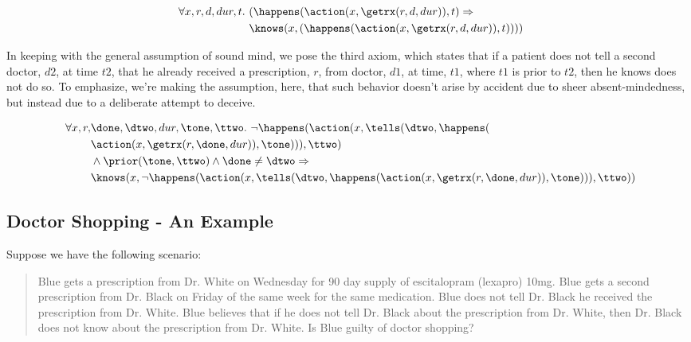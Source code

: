 \begin{footnotesize}
\begin{align*}
[A2] \ \forall x, r, d, dur, t . \ &(\happens(\action(x, \getrx(r, d, dur)), t) \Rightarrow \\
& \knows(x,(\happens(\action(x,\getrx(r,d,dur)), t))))
\end{align*}
\end{footnotesize}

In keeping with the general assumption of sound mind, we pose the third axiom, which states that if a patient does not tell a second doctor, $d2$, at time $t2$, that he already received a prescription, $r$, from doctor, $d1$, at time, $t1$, where $t1$ is prior to $t2$, then he knows does not do so.  To emphasize, we're making the assumption, here, that such behavior doesn't arise by accident due to sheer absent-mindedness, but instead due to a deliberate attempt to deceive.


\begin{footnotesize}
\begin{align*}
[A3] \ \forall x, r, &\done, \dtwo, dur, \tone, \ttwo . \ \neg \happens(\action(x,\tells(\dtwo,\happens( \\
& \action(x,\getrx(r,\done,dur)),\tone))),\ttwo) \\
& \wedge \prior(\tone,\ttwo) \wedge \done \neq \dtwo \Rightarrow \\
& \knows(x, \neg \happens(\action(x,\tells(\dtwo,\happens(\action(x,\getrx(r,\done,dur)),\tone))),\ttwo))
\end{align*}
\end{footnotesize}


\subsection{Doctor Shopping - An Example}

Suppose we have the following scenario:
\blockquote{Blue gets a prescription from Dr. White on Wednesday for 90 day supply of escitalopram (lexapro) 10mg.  Blue gets a second prescription from Dr. Black on Friday of the same week for the same medication.  Blue does not tell Dr. Black he received the prescription from Dr. White.  Blue believes that if he does not tell Dr. Black about the prescription from Dr. White, then Dr. Black does not know about the prescription from Dr. White.  Is Blue guilty of doctor shopping?}

